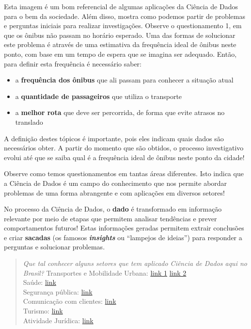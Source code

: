 \documentclass[
  portuguese,
  oneside]{book}
\providecommand{\tightlist}{%
  \setlength{\itemsep}{0pt}\setlength{\parskip}{0pt}}
\begin{document}
Esta imagem é um bom referencial de algumas aplicações da Ciência de Dados para o bem da sociedade. Além disso, mostra como podemos partir de problemas e perguntas iniciais para realizar investigações. Observe o questionamento 1, em que os ônibus não passam no horário esperado. Uma das formas de solucionar este problema é através de uma estimativa da frequência ideal de ônibus neste ponto, com base em um tempo de espera que se imagina ser adequado. Então, para definir esta frequência é necessário saber:

\begin{itemize}
\tightlist
\item
  a \textbf{frequência dos ônibus} que ali passam para conhecer a situação atual
\item
  a \textbf{quantidade de passageiros} que utiliza o transporte
\item
  a \textbf{melhor rota} que deve ser percorrida, de forma que evite atrasos no translado
\end{itemize}

A definição destes tópicos é importante, pois eles indicam quais dados são necessários obter. A partir do momento que são obtidos, o processo investigativo evolui até que se saiba qual é a frequência ideal de ônibus neste ponto da cidade!

Observe como temos questionamentos em tantas áreas diferentes. Isto indica que a Ciência de Dados é um campo do conhecimento que nos permite abordar problemas de uma forma abrangente e com aplicações em diversos setores!

No processo da Ciência de Dados, o \textbf{dado} é transformado em informação relevante por meio de etapas que permitem analisar tendências e prever comportamentos futuros! Estas informações geradas permitem extrair conclusões e criar \textbf{sacadas} (os famosos \emph{\textbf{insights}} ou ``lampejos de ideias'') para responder a perguntas e solucionar problemas.

\begin{quote}
\emph{Que tal conhecer alguns setores que tem aplicado Ciência de Dados aqui no Brasil?}
Transportes e Mobilidade Urbana: \href{https://jornal.usp.br/ciencias/ciencias-humanas/dados-sobre-onibus-em-sp-permitirao-analises-criticas-do-servico/}{link 1} \href{https://www.caf.com/pt/presente/noticias/2019/03/ciencia-dados-para-aprimorar-as-politicas-publicas-a-experiencia-de-cordoba/}{link 2}\\
Saúde: \href{https://www.einstein.br/Pages/Home.aspx}{link}\\
Segurança pública: \href{https://jornal.usp.br/universidade/acoes-para-comunidade/pesquisadores-aplicam-ciencia-de-dados-e-inteligencia-artificial-no-combate-ao-crime/}{link}\\
Comunicação com clientes: \href{https://g1.globo.com/jornal-nacional/noticia/2019/03/09/ligacoes-de-robos-incomodam-muitos-brasileiros.ghtml}{link}\\
Turismo: \href{https://datascienceacademy.com.br/blog/7-casos-de-uso-de-data-science-no-turismo/}{link}\\
Atividade Jurídica: \href{http://www.crb8.org.br/entrevista-sofia-marshallowitz-ciencia-de-dados-aplicada-ao-direito/}{link}
\end{quote}
\end{document}
